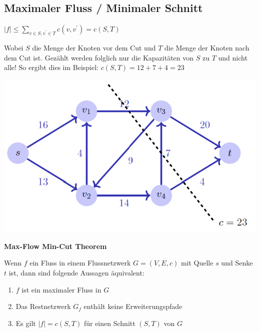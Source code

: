 \vspace{-4pt}
\begin{sectionbox}
\subsection{Maximaler Fluss / Minimaler Schnitt}\smallskip
\begin{emphbox}
$|f| \leq \sum\limits_{v \in S, v^{\prime} \in T} c\left(v, v^{\prime}\right)=c(S, T)$
\end{emphbox}
Wobei $S$ die Menge der Knoten vor dem Cut und $T$ die Menge der Knoten nach dem Cut ist. Gezählt werden folglich nur die Kapazitäten von $S$ zu $T$ und nicht alle! So ergibt dies im Beispiel: $c(S,T)=12+7+4=23$\par\smallskip

\begin{center}
    \includegraphics[width = 0.9\columnwidth]{../img/maxFlow.png}
\end{center}\par\smallskip

\begin{greenbox}
\textbf{Max-Flow Min-Cut Theorem}\par
Wenn $f$ ein Fluss in einem Flussnetzwerk $G=(V, E, c)$ mit Quelle $s$ und Senke $t$ ist, dann sind folgende Aussagen äquivalent:
\begin{enumerate}
    \item $f$ ist ein maximaler Fluss in $G$
    \item Das Restnetzwerk $G_{f}$ enthält keine Erweiterungspfade
    \item Es gilt $|f|=c(S, T)$ für einen Schnitt $(S, T)$ von $G$
\end{enumerate}
\end{greenbox}\vspace{10px}
\end{sectionbox}
